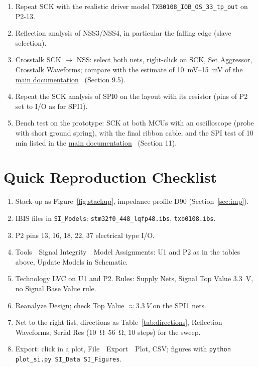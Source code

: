 \documentclass[11pt,a4paper]{article}
\newcommand{\gui}[1]{\textsf{#1}}
\newcommand{\m}{\,\guillemotright\ }
\newcommand{\maindoc}{\href{run:BYTE_SPIne_Documentation.pdf}{main documentation}~\cite{main}}
\begin{document}
\begin{enumerate}
    \item Repeat SCK with the realistic driver model \texttt{TXB0108\_IOB\_OS\_33\_tp\_out} on P2-13.
    \item Reflection analysis of NSS3/NSS4, in particular the falling edge (slave selection).
    \item Crosstalk SCK $\to$ NSS: select both nets, right-click on SCK, \gui{Set Aggressor}, \gui{Crosstalk Waveforms};
    compare with the estimate of \qtyrange{10}{15}{mV} of the \maindoc{} (Section 9.5).
    \item Repeat the SCK analysis of SPI0 on the layout with its resistor (pins of P2 set to I/O as
    for SPI1).
    \item Bench test on the prototype: SCK at both MCUs with an oscilloscope (probe with short
    ground spring), with the final ribbon cable, and the SPI test of 10\,min listed in the \maindoc{} (Section 11).
\end{enumerate}

\section{Quick Reproduction Checklist}

\begin{enumerate}[nosep]
    \item Stack-up as Figure~\ref{fig:stackup}, impedance profile D90 (Section~\ref{sec:imp}).
    \item IBIS files in \texttt{SI\_Models}: \texttt{stm32f0\_448\_lqfp48.ibs}, \texttt{txb0108.ibs}.
    \item P2 pins 13, 16, 18, 22, 37 electrical type I/O.
    \item \gui{Tools \m Signal Integrity \m Model Assignments}: U1 and P2 as in the tables above, \gui{Update
    Models in Schematic}.
    \item Technology LVC on U1 and P2. Rules: Supply Nets, Signal Top Value \qty{3.3}{V}, no Signal
    Base Value rule.
    \item \gui{Reanalyze Design}; check Top Value $\approx\qty{3.3}{V}$ on the SPI1 nets.
    \item Net to the right list, directions as Table~\ref{tab:directions}, \gui{Reflection Waveforms}; Serial Res (\qtyrange[range-phrase=--, range-units=single]{10}{56}{\ohm}, 10
    steps) for the sweep.
    \item Export: click in a plot, \gui{File \m Export \m Plot}, CSV; figures with \texttt{python plot\_si.py
    SI\_Data SI\_Figures}.
\end{enumerate}
\end{document}
